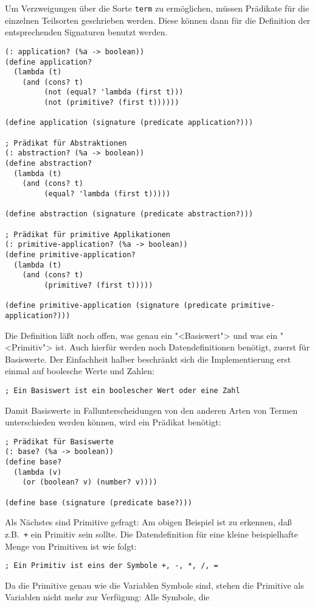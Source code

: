 Um Verzweigungen über die Sorte \texttt{term} zu ermöglichen, müssen
Prädikate für die einzelnen Teilsorten geschrieben werden.  Diese
können dann für die Definition der entsprechenden Signaturen benutzt
werden.
%
\begin{verbatim}
(: application? (%a -> boolean))
(define application?
  (lambda (t)
    (and (cons? t)
         (not (equal? 'lambda (first t)))
         (not (primitive? (first t))))))

(define application (signature (predicate application?)))

; Prädikat für Abstraktionen
(: abstraction? (%a -> boolean))
(define abstraction?
  (lambda (t)
    (and (cons? t)
         (equal? 'lambda (first t)))))

(define abstraction (signature (predicate abstraction?)))

; Prädikat für primitive Applikationen
(: primitive-application? (%a -> boolean))
(define primitive-application?
  (lambda (t)
    (and (cons? t)
         (primitive? (first t)))))

(define primitive-application (signature (predicate primitive-application?)))
\end{verbatim}
%
Die Definition läßt noch offen, was genau ein "<Basiswert"> und was ein
"<Primitiv"> ist.  Auch hierfür werden noch Datendefinitionen
benötigt, zuerst für Basiswerte.  Der Einfachheit halber beschränkt
sich die Implementierung erst einmal auf boolesche Werte und Zahlen:
%
\begin{verbatim}
; Ein Basiswert ist ein boolescher Wert oder eine Zahl
\end{verbatim}
%
Damit Basiswerte in Fallunterscheidungen von den anderen Arten von
Termen unterschieden werden können, wird ein Prädikat benötigt:
%
\begin{verbatim}
; Prädikat für Basiswerte
(: base? (%a -> boolean))
(define base?
  (lambda (v)
    (or (boolean? v) (number? v))))

(define base (signature (predicate base?)))
\end{verbatim}
%
Als Nächstes sind Primitive gefragt: Am obigen Beispiel ist zu
erkennen, daß z.B.\ \texttt{+} ein Primitiv sein sollte.  Die
Datendefinition für eine kleine beispielhafte Menge von Primitiven ist
wie folgt:
%
\begin{verbatim}
; Ein Primitiv ist eins der Symbole +, -, *, /, =
\end{verbatim}
%
Da die Primitive genau wie die Variablen Symbole sind, stehen die
Primitive als Variablen nicht mehr zur Verfügung:  Alle Symbole, die
